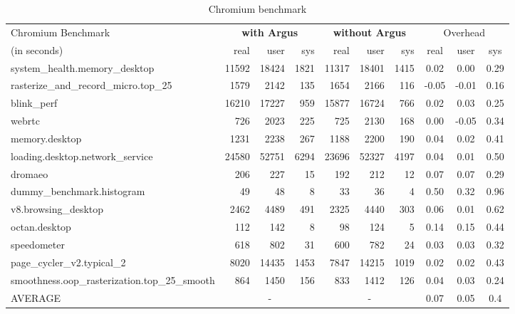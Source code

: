 \begin{table*}[ht]
\footnotesize
\centering
\begin{tabular}{l|rrr|rrr|ccc}
	\hline
	\hline
Chromium Benchmark&\multicolumn{3}{c}{\textbf{with Argus}} & \multicolumn{3}{c}{\textbf{without Argus}} & \multicolumn{3}{c}{Overhead}\\
(in seconds)& real & user & sys & real & user & sys & real & user & sys \\
\hline
system\_health.memory\_desktop & 11592 & 18424 & 1821 & 11317 & 18401 & 1415 & 0.02 & 0.00 & 0.29\\
rasterize\_and\_record\_micro.top\_25 & 1579 & 2142 & 135 & 1654 & 2166 & 116 & -0.05 & -0.01 & 0.16\\
blink\_perf & 16210 & 17227 & 959 & 15877 & 16724 & 766 & 0.02 & 0.03 & 0.25\\
webrtc & 726 & 2023 & 225 & 725 & 2130 & 168 & 0.00 & -0.05 & 0.34\\
memory.desktop & 1231 & 2238 & 267 & 1188 & 2200 & 190 & 0.04 & 0.02 & 0.41\\
loading.desktop.network\_service & 24580 & 52751 & 6294 & 23696 & 52327 & 4197 & 0.04 & 0.01 & 0.50\\
dromaeo & 206 & 227 & 15 & 192 & 212 & 12 & 0.07 & 0.07 & 0.29\\
dummy\_benchmark.histogram & 49 & 48 & 8 & 33 & 36 & 4 & 0.50 & 0.32 & 0.96\\
v8.browsing\_desktop & 2462 & 4489 & 491 & 2325 & 4440 & 303 & 0.06 & 0.01 & 0.62\\
octan.desktop & 112 & 142 & 8 & 98 & 124 & 5 & 0.14 & 0.15 & 0.44\\
speedometer & 618 & 802 & 31 & 600 & 782 & 24 & 0.03 & 0.03 & 0.32\\
page\_cycler\_v2.typical\_2 & 8020 & 14435 & 1453 & 7847 & 14215 & 1019 & 0.02 & 0.02 & 0.43\\
smoothness.oop\_rasterization.top\_25\_smooth & 864 & 1450 & 156 & 833 & 1412 & 126 & 0.04 & 0.03 & 0.24\\
\hline
AVERAGE & \multicolumn{3}{c}{-} &  \multicolumn{3}{c}{-}  & 0.07 & 0.05 & 0.4\\
\hline
\hline
\end{tabular}
\caption{Chromium benchmark}
\label{tab:chromium benchmark}
\end{table*}

